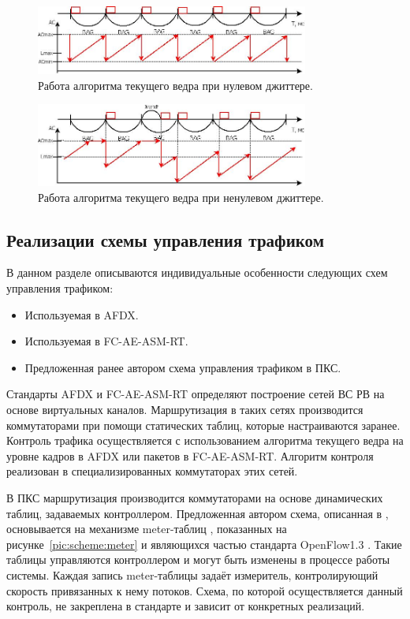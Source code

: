 \documentclass[12pt, a4paper]{article}
\begin{document}
\begin{figure}[h!]
	\centering
	\includegraphics[width=0.80\textwidth]{img/nojit.png}
	\caption[russian]{Работа алгоритма текущего ведра при нулевом джиттере.}
	\label{pic:scheme:nojit}
\end{figure}

\begin{figure}[h!]
	\centering
	\includegraphics[width=0.80\textwidth]{img/jit.png}
	\caption{Работа алгоритма текущего ведра при ненулевом джиттере.}
	\label{pic:scheme:jit}
\end{figure}
\FloatBarrier

\subsection{Реализации схемы управления трафиком}
В данном разделе описываются индивидуальные особенности следующих схем управления трафиком:
\begin{itemize}
	\item Используемая в AFDX.
	\item Используемая в FC-AE-ASM-RT.
	\item Предложенная ранее автором схема управления трафиком в ПКС.
\end{itemize}

Стандарты AFDX и FC-AE-ASM-RT определяют построение сетей ВС РВ на основе виртуальных каналов. Маршрутизация в таких сетях производится коммутаторами при помощи статических таблиц, которые настраиваются заранее. Контроль трафика осуществляется с использованием алгоритма текущего ведра на уровне кадров в AFDX или пакетов в FC-AE-ASM-RT. Алгоритм контроля реализован в специализированных коммутаторах этих сетей.

В ПКС маршрутизация производится коммутаторами на основе динамических таблиц, задаваемых контроллером. Предложенная автором схема, описанная в \cite{vlsdn}, основывается на механизме meter-таблиц \cite{meter}, показанных на рисунке~\ref{pic:scheme:meter} и являющихся частью стандарта OpenFlow1.3 \cite{openflow}. Такие таблицы управляются контроллером и могут быть изменены в процессе работы системы. Каждая запись meter-таблицы задаёт измеритель, контролирующий скорость привязанных к нему потоков. Схема, по которой осуществляется данный контроль, не закреплена в стандарте и зависит от конкретных реализаций. 
\end{document}
